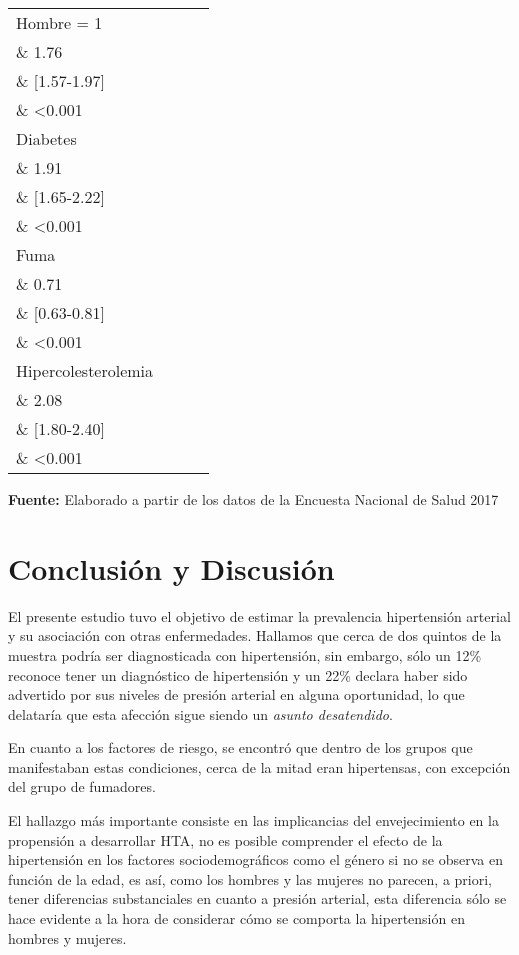 \documentclass{aa}
\begin{document}
\begin{table}[b]
\begin{tabular}{lrcr}
\addlinespace
Hombre = 1 \\\& 1.76 \\\& [1.57-1.97] \\\& <0.001\\
Diabetes \\\& 1.91 \\\& [1.65-2.22] \\\& <0.001\\
\addlinespace
Fuma \\\& 0.71 \\\& [0.63-0.81] \\\& <0.001\\
\addlinespace
Hipercolesterolemia \\\& 2.08 \\\& [1.80-2.40] \\\& <0.001\\
\bottomrule
\end{tabular}
    \vspace{1ex}
    
    {\raggedright \small \textbf{Fuente:} Elaborado a partir de los datos de la Encuesta Nacional de Salud 2017 \par}
\end{table}


\section{Conclusión y Discusión}

El presente estudio tuvo el objetivo de estimar la prevalencia hipertensión arterial y su asociación con otras enfermedades. Hallamos que cerca de dos quintos de la muestra podría ser diagnosticada con hipertensión, sin embargo, sólo un 12\% reconoce tener un diagnóstico de hipertensión y un 22\% declara haber sido advertido por sus niveles de presión arterial en alguna oportunidad, lo que delataría que esta afección sigue siendo un \textit{asunto desatendido}. 

En cuanto a los factores de riesgo, se encontró que dentro de los grupos que manifestaban estas condiciones, cerca de la mitad eran hipertensas, con excepción del grupo de fumadores. 

El hallazgo más importante consiste en las implicancias del envejecimiento en la propensión a desarrollar HTA, no es posible comprender el efecto de la hipertensión en los factores sociodemográficos como el género si no se observa en función de la edad, es así, como los hombres y las mujeres no parecen, a priori, tener diferencias substanciales en cuanto a presión arterial, esta diferencia sólo se hace evidente a la hora de considerar cómo se comporta la hipertensión en hombres y mujeres.
\end{document}
